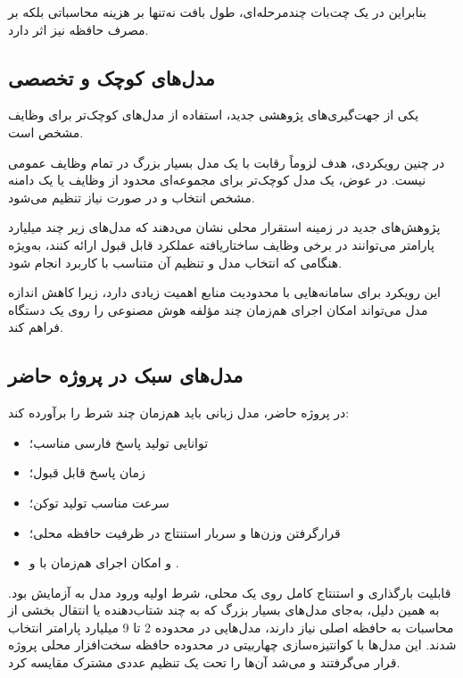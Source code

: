 بنابراین در یک چت‌بات چندمرحله‌ای، طول بافت نه‌تنها بر هزینه
محاسباتی بلکه بر مصرف حافظه نیز اثر دارد.


\subsection{مدل‌های کوچک و تخصصی}

یکی از جهت‌گیری‌های پژوهشی جدید، استفاده از مدل‌های کوچک‌تر
برای وظایف مشخص است.

در چنین رویکردی، هدف لزوماً رقابت با یک مدل بسیار بزرگ در
تمام وظایف عمومی نیست.
در عوض، یک مدل کوچک‌تر برای مجموعه‌ای محدود از وظایف یا
یک دامنه مشخص انتخاب و در صورت نیاز تنظیم می‌شود.

پژوهش‌های جدید در زمینه استقرار محلی نشان می‌دهند که مدل‌های
زیر چند میلیارد پارامتر می‌توانند در برخی وظایف ساختاریافته
عملکرد قابل قبول ارائه کنند، به‌ویژه هنگامی که انتخاب مدل و
تنظیم آن متناسب با کاربرد انجام شود.

این رویکرد برای سامانه‌هایی با محدودیت منابع اهمیت زیادی دارد،
زیرا کاهش اندازه مدل می‌تواند امکان اجرای هم‌زمان چند مؤلفه
هوش مصنوعی را روی یک دستگاه فراهم کند.


\subsection{مدل‌های سبک در پروژه حاضر}

در پروژه حاضر، مدل زبانی باید هم‌زمان چند شرط را برآورده کند:

\begin{itemize}

    \item توانایی تولید پاسخ فارسی مناسب؛

    \item زمان پاسخ قابل قبول؛

    \item سرعت مناسب تولید توکن؛

    \item قرارگرفتن وزن‌ها و سربار استنتاج در ظرفیت حافظه  محلی؛

    \item و امکان اجرای هم‌زمان با  و .

\end{itemize}

قابلیت بارگذاری و استنتاج کامل روی یک  محلی، شرط اولیه
ورود مدل به آزمایش بود. به همین دلیل، به‌جای مدل‌های بسیار بزرگ
که به چند شتاب‌دهنده یا انتقال بخشی از محاسبات به حافظه اصلی نیاز
دارند، مدل‌هایی در محدوده 2 تا 9 میلیارد پارامتر انتخاب شدند.
این مدل‌ها با کوانتیزه‌سازی چهاربیتی  در محدوده حافظه
سخت‌افزار محلی پروژه قرار می‌گرفتند و می‌شد آن‌ها را تحت یک تنظیم
عددی مشترک مقایسه کرد.


